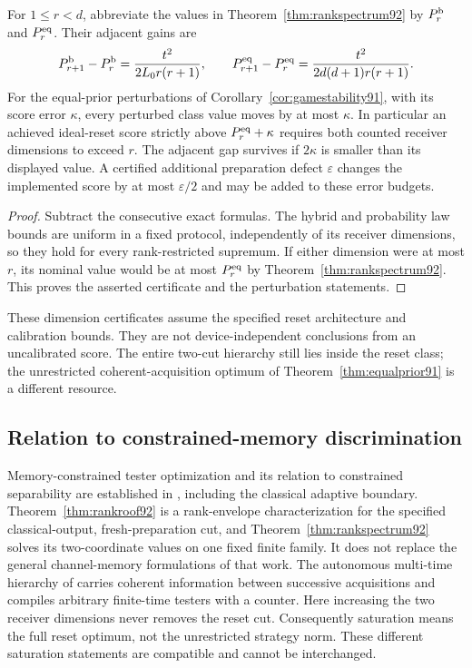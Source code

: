 \begin{corollary}
\label{cor:rankwitness92}
For $1\le r<d$, abbreviate the values in
Theorem~\ref{thm:rankspectrum92} by $P_r^{\rm b}$ and $P_r^{\rm eq}$.
Their adjacent gains are
\[
 P_{r+1}^{\rm b}-P_r^{\rm b}=\frac{t^2}{2L_0r(r+1)},\qquad
 P_{r+1}^{\rm eq}-P_r^{\rm eq}
       =\frac{t^2}{2d(d+1)r(r+1)}.
\]
For the equal-prior perturbations of Corollary~\ref{cor:gamestability91},
with its score error $\kappa$, every perturbed class value moves by at
most $\kappa$.  In particular an achieved ideal-reset score strictly
above $P_r^{\rm eq}+\kappa$ requires both counted receiver dimensions
to exceed $r$.  The adjacent gap survives if $2\kappa$ is smaller
than its displayed value.  A certified additional preparation defect
$\varepsilon$ changes the implemented score by at most $\varepsilon/2$
and may be added to these error budgets.
\end{corollary}
\begin{proof}
Subtract the consecutive exact formulas.  The hybrid and probability
law bounds are uniform in a fixed protocol, independently of its
receiver dimensions, so they hold for every rank-restricted supremum.
If either dimension were at most $r$, its nominal value would be at
most $P_r^{\rm eq}$ by Theorem~\ref{thm:rankspectrum92}.  This proves
the asserted certificate and the perturbation statements.
\end{proof}
These dimension certificates assume the specified reset architecture
and calibration bounds.  They are not device-independent conclusions
from an uncalibrated score.  The entire two-cut hierarchy still lies
inside the reset class; the unrestricted coherent-acquisition optimum
of Theorem~\ref{thm:equalprior91} is a different resource.

\subsection{Relation to constrained-memory discrimination}
Memory-constrained tester optimization and its relation to constrained
separability are established in \cite{OZNPQ89}, including the classical
adaptive boundary.  Theorem~\ref{thm:rankroof92} is a rank-envelope
characterization for the specified classical-output, fresh-preparation
cut, and Theorem~\ref{thm:rankspectrum92} solves its two-coordinate
values on one fixed finite family.  It does not replace the general
channel-memory formulations of that work.  The autonomous multi-time
hierarchy of \cite{ZB90} carries coherent information between successive
acquisitions and compiles arbitrary finite-time testers with a counter.
Here increasing the two receiver dimensions never removes the reset
cut.  Consequently saturation means the full reset optimum, not the
unrestricted strategy norm.  These different saturation statements
are compatible and cannot be interchanged.
